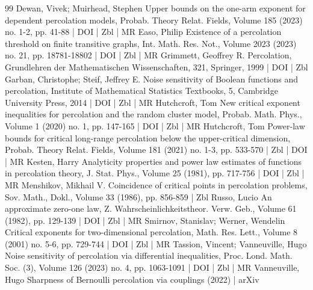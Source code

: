 \begin{thebibliography}{99}
 Dewan, Vivek; Muirhead, Stephen Upper bounds on the one-arm exponent for dependent percolation models, Probab. Theory Relat. Fields, Volume 185 (2023) no. 1-2, pp. 41-88 | DOI | Zbl | MR
 Easo, Philip Existence of a percolation threshold on finite transitive graphs, Int. Math. Res. Not., Volume 2023 (2023) no. 21, pp. 18781-18802 | DOI | Zbl | MR
 Grimmett, Geoffrey R. Percolation, Grundlehren der Mathematischen Wissenschaften, 321, Springer, 1999 | DOI | Zbl
 Garban, Christophe; Steif, Jeffrey E. Noise sensitivity of Boolean functions and percolation, Institute of Mathematical Statistics Textbooks, 5, Cambridge University Press, 2014 | DOI | Zbl | MR
 Hutchcroft, Tom New critical exponent inequalities for percolation and the random cluster model, Probab. Math. Phys., Volume 1 (2020) no. 1, pp. 147-165 | DOI | Zbl | MR
 Hutchcroft, Tom Power-law bounds for critical long-range percolation below the upper-critical dimension, Probab. Theory Relat. Fields, Volume 181 (2021) no. 1-3, pp. 533-570 | Zbl | DOI | MR
 Kesten, Harry Analyticity properties and power law estimates of functions in percolation theory, J. Stat. Phys., Volume 25 (1981), pp. 717-756 | DOI | Zbl | MR
 Menshikov, Mikhail V. Coincidence of critical points in percolation problems, Sov. Math., Dokl., Volume 33 (1986), pp. 856-859 | Zbl
 Russo, Lucio An approximate zero-one law, Z. Wahrscheinlichkeitstheor. Verw. Geb., Volume 61 (1982), pp. 129-139 | DOI | Zbl | MR
 Smirnov, Stanislav; Werner, Wendelin Critical exponents for two-dimensional percolation, Math. Res. Lett., Volume 8 (2001) no. 5-6, pp. 729-744 | DOI | Zbl | MR
 Tassion, Vincent; Vanneuville, Hugo Noise sensitivity of percolation via differential inequalities, Proc. Lond. Math. Soc. (3), Volume 126 (2023) no. 4, pp. 1063-1091 | DOI | Zbl | MR
 Vanneuville, Hugo Sharpness of Bernoulli percolation via couplings (2022) | arXiv
\end{thebibliography}

